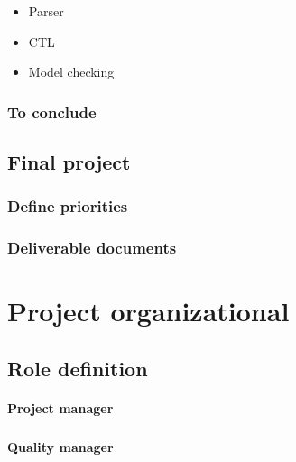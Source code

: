 \documentclass{report}
\begin{document}
\vspace{4mm}
\begin{itemize}
\item Parser\vspace{1mm}
\item CTL\vspace{1mm}
\item Model checking\vspace{1mm}
\end{itemize}

\subsection{To conclude}

\section{Final project}

\subsection{Define priorities}

\subsection{Deliverable documents}

\chapter{Project organizational}

\section{Role definition}

\subsubsection{Project manager}

\paragraph{}
\hspace{4mm}\textnormal{}

\subsubsection{Quality manager}
\end{document}
